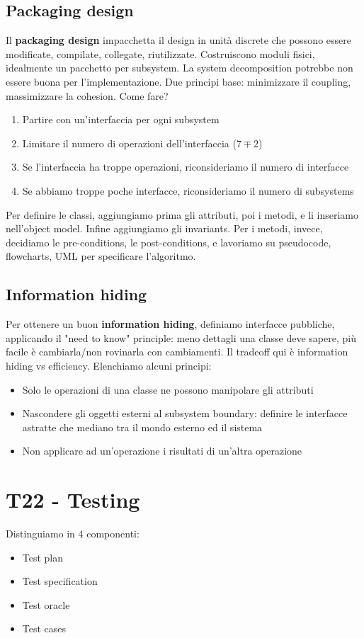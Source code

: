 \documentclass[11pt]{article}
\begin{document}
\subsection{Packaging design}
Il \textbf{packaging design} impacchetta il design in unità discrete che possono essere modificate, compilate, collegate, riutilizzate. Costruiscono moduli fisici, idealmente un pacchetto per subsystem. La system decomposition potrebbe non essere buona per l'implementazione. Due principi base: minimizzare il coupling, massimizzare la cohesion. Come fare?
\begin{enumerate}
    \item Partire con un'interfaccia per ogni subsystem 
    \item Limitare il numero di operazioni dell'interfaccia ($7 \mp 2$)
    \item Se l'interfaccia ha troppe operazioni, riconsideriamo il numero di interfacce 
    \item Se abbiamo troppe poche interfacce, riconsideriamo il numero di subsystems
\end{enumerate}
Per definire le classi, aggiungiamo prima gli attributi, poi i metodi, e li inseriamo nell'object model. Infine aggiungiamo gli invariants. Per i metodi, invece, decidiamo le pre-conditions, le post-conditions, e lavoriamo su pseudocode, flowcharts, UML per specificare l'algoritmo.
\subsection{Information hiding}
Per ottenere un buon \textbf{information hiding}, definiamo interfacce pubbliche, applicando il "need to know" principle: meno dettagli una classe deve sapere, più facile è cambiarla/non rovinarla con cambiamenti. Il tradeoff qui è information hiding vs efficiency. Elenchiamo alcuni principi:
\begin{itemize}
    \item Solo le operazioni di una classe ne possono manipolare gli attributi 
    \item Nascondere gli oggetti esterni al subsystem boundary: definire le interfacce astratte che mediano tra il mondo esterno ed il sistema
    \item Non applicare ad un'operazione i risultati di un'altra operazione
\end{itemize}
\section{T22 - Testing}
Distinguiamo in 4 componenti:
\begin{itemize}
    \item Test plan
    \item Test specification 
    \item Test oracle
    \item Test cases
\end{itemize}
\end{document}

